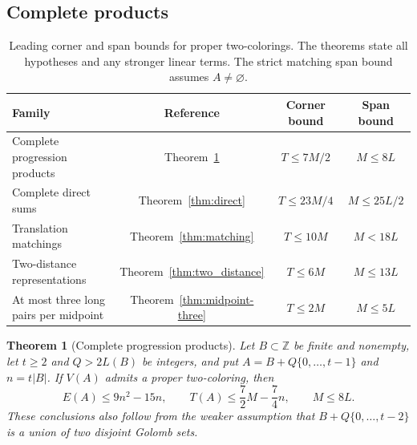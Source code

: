 \documentclass[11pt,a4paper]{article}
\newtheorem{theorem}{Theorem}[section]
\theoremstyle{definition}
\newcommand{\Z}{\mathbb Z}
\numberwithin{equation}{section}
\begin{document}
\subsection{Complete products}
\begin{table}[H]
\centering
\caption{Leading corner and span bounds for proper two-colorings. The theorems state all hypotheses and any stronger linear terms. The strict matching span bound assumes $A\ne\varnothing$.}
\label{tab:structured}
\begin{tabular}{@{}lccc@{}}
\toprule Family & Reference & Corner bound & Span bound\\\midrule
Complete progression products & Theorem~\ref{thm:progression} & $T\le7M/2$ & $M\le8L$\\
Complete direct sums & Theorem~\ref{thm:direct} & $T\le23M/4$ & $M\le25L/2$\\
Translation matchings & Theorem~\ref{thm:matching} & $T\le10M$ & $M<18L$\\
Two-distance representations & Theorem~\ref{thm:two_distance} & $T\le6M$ & $M\le13L$\\
At most three long pairs per midpoint & Theorem~\ref{thm:midpoint-three} & $T\le2M$ & $M\le5L$\\
\bottomrule
\end{tabular}
\end{table}
\begin{theorem}[Complete progression products]\label{thm:progression}
Let $B\subset\Z$ be finite and nonempty, let $t\ge2$ and $Q>2L(B)$ be integers, and put $A=B+Q\{0,\ldots,t-1\}$ and $n=t|B|$. If $V(A)$ admits a proper two-coloring, then
\begin{equation}\label{eq:progression-bounds}
E(A)\le9n^2-15n,\qquad
T(A)\le\frac72M-\frac74n,\qquad M\le8L.
\end{equation}
These conclusions also follow from the weaker assumption that $B+Q\{0,\ldots,t-2\}$ is a union of two disjoint Golomb sets.
\end{theorem}
\end{document}
